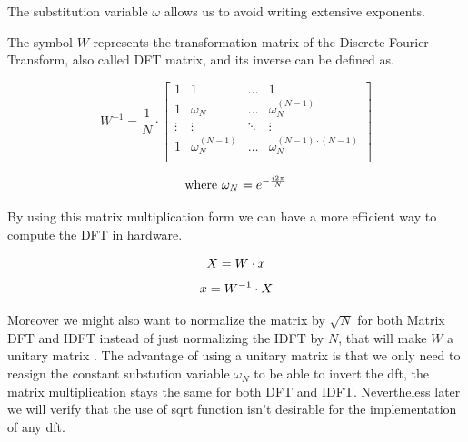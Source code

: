 \documentclass[
  oneside,
  11pt, a4paper,
  footinclude=true,
  headinclude=true,
  cleardoublepage=empty
]{scrbook}
\newcommand{\eqname}[1]{\tag*{#1}}%
\begin{document}
The substitution variable \(\omega\) allows us to avoid writing extensive exponents.

The symbol \(W\) represents the transformation matrix of the Discrete Fourier Transform, also called DFT matrix, and its inverse can be defined as.

\begin{equation*}
    W^{-1} = \frac{1}{N} \cdot
    \begin{bmatrix}
        1      & 1                  & \dots  & 1                              \\
        1      & \omega_{N}         & \dots  & \omega_{N}^{(N-1)}             \\
        \vdots & \vdots             & \ddots & \vdots                         \\
        1      & \omega_{N}^{(N-1)} & \dots  & \omega_{N}^{(N-1) \cdot (N-1)} \\
    \end{bmatrix}
\end{equation*}

\begin{equation*}
    \text{where } \omega_{N} = e^{- \frac{i 2 \pi}{N}} \\
\end{equation*}

By using this matrix multiplication form we can have a more efficient way to compute the DFT in hardware.  

\begin{equation*}
    X = W \cdot x \\ %
\end{equation*}
\begin{equation*}
    x = W^{-1} \cdot X \\ %
\end{equation*}

Moreover we might also want to normalize the matrix by \( \sqrt{N} \) for both Matrix DFT and IDFT instead of just normalizing the IDFT by \(N\), that will make \(W\) a unitary matrix \cite{horn2012matrix}.
The advantage of using a unitary matrix is that we only need to reasign the constant substution variable \(\omega_{N}\) to be able to invert the dft, the matrix multiplication stays the same for both DFT and IDFT. Nevertheless later we will verify that the use of sqrt function isn't desirable for the implementation of any dft.
\end{document}
